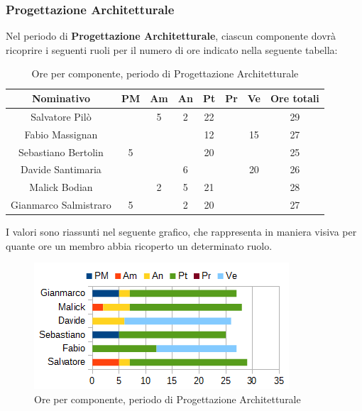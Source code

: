		\subsubsection{Progettazione Architetturale}
		Nel periodo di \textbf{Progettazione Architetturale}, ciascun componente dovrà ricoprire i seguenti ruoli per il numero di ore indicato nella seguente tabella: \\
		\begin{table}[H]
		\centering
		\begin{tabular}{|c|c|c|c|c|c|c|c|}
			\hline
			\textbf{Nominativo}		& \textbf{PM}	& \textbf{Am}	& \textbf{An}	& \textbf{Pt}	& \textbf{Pr}	& \textbf{Ve}	& \textbf{Ore totali}     \\
			\hline
			Salvatore Pilò			& 		& 5 	& 2		& 22	&		&		& 29 \\
			Fabio Massignan			&		& 		& 		& 12	&		& 15	& 27 \\
			Sebastiano Bertolin		& 5		& 		&  		& 20	&		&		& 25 \\
			Davide Santimaria		&		& 		& 6		&		&		& 20	& 26 \\
			Malick Bodian			& 		& 2		& 5		& 21	&		& 		& 28 \\
			Gianmarco Salmistraro	& 5		& 		& 2		& 20	&		& 		& 27 \\
			\hline
		\end{tabular}
		\caption{Ore per componente, periodo di Progettazione Architetturale}
		\end{table}
		I valori sono riassunti nel seguente grafico, che rappresenta in maniera visiva per quante ore un membro abbia ricoperto un determinato ruolo. \\
		\begin{figure}[H]
			\centering
			\includegraphics[scale=1]{immagini/grafici/progettazione_architetturale-barra.png}
			\caption{Ore per componente, periodo di Progettazione Architetturale}
		\end{figure}
